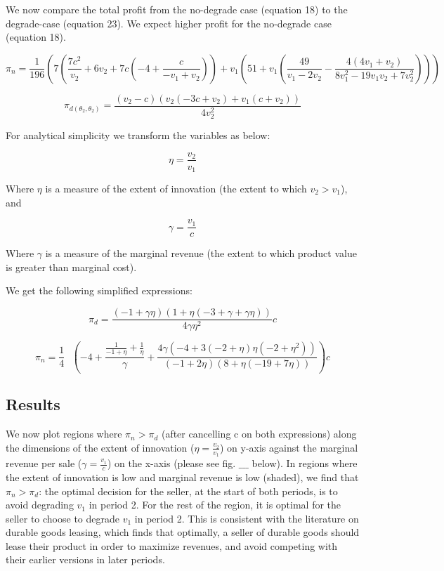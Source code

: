 \documentclass{article}
\begin{document}
We now compare the total profit from the no-degrade case (equation 18) to the degrade-case (equation 23). We expect higher profit for the no-degrade
case (equation 18).

\[\pi _n=\frac{1}{196} \left(7 \left(\frac{7 c^2}{v_2}+6 v_2+7 c \left(-4+\frac{c}{-v_1+v_2}\right)\right)+v_1 \left(51+v_1 \left(\frac{49}{v_1-2
v_2}-\frac{4 \left(4 v_1+v_2\right)}{8 v_1^2-19 v_1 v_2+7 v_2^2}\right)\right)\right)\]

\[\pi _{d\left(\theta _2,\theta _2\right)}=\frac{\left(v_2-c\right) \left(v_2 \left(-3 c+v_2\right)+v_1 \left(c+v_2\right)\right)}{4 v_2^2}\]

For analytical simplicity we transform the variables as below:

\begin{equation}
\eta  =\frac{v_2}{v_1}
\end{equation}

Where $\eta $ is a measure of the extent of innovation (the extent to which \(v_2>v_1\)), and

\begin{equation}
\gamma =\frac{v_1}{c}
\end{equation}

Where $\gamma $ is a measure of the marginal revenue (the extent to which product value is greater than marginal cost).

We get the following simplified expressions:

\begin{equation}
\pi _d=\frac{(-1+\gamma  \eta ) (1+\eta  (-3+\gamma +\gamma  \eta ))}{4 \gamma  \eta ^2}c
\end{equation}

\begin{equation}
\pi _n=\frac{1}{4}\text{  }\left(-4+\frac{\frac{1}{-1+\eta }+\frac{1}{\eta }}{\gamma }+\frac{4 \gamma  \left(-4+3 (-2+\eta ) \eta  \left(-2+\eta
^2\right)\right)}{(-1+2 \eta ) (8+\eta  (-19+7 \eta ))}\right)c
\end{equation}

\subsection*{Results}

We now plot regions where \(\pi _n>\pi _d\) (after cancelling c on both expressions) along the dimensions of the extent of innovation (\(\eta  =\frac{v_2}{v_1}\))
on y-axis against the marginal revenue per sale (\(\gamma =\frac{v_1}{c}\)) on the x-axis (please see fig. $\_\_\_$ below). In regions where the
extent of innovation is low and marginal revenue is low (shaded), we find that \(\pi _n>\pi _d\): the optimal decision for the seller, at the start
of both periods, is to avoid degrading \(v_1\) in period 2. For the rest of the region, it is optimal for the seller to choose to degrade \(v_1\)
in period 2. This is consistent with the literature on durable goods leasing, which finds that optimally, a seller of durable goods should lease
their product in order to maximize revenues, and avoid competing with their earlier versions in later periods.
\end{document}
